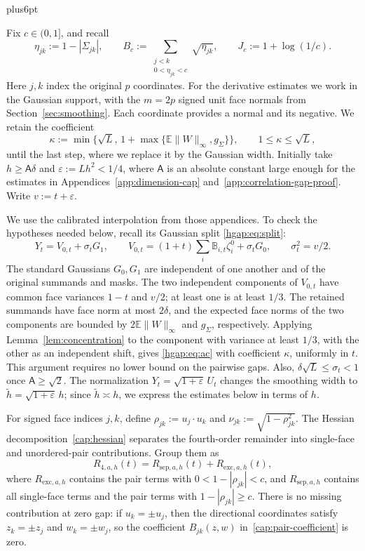 \documentclass[11pt,letterpaper,twoside,leqno]{article}
\makeatletter
\theoremstyle{bookplain}
\theoremstyle{bookremark}
\renewenvironment{proof}[1][\proofname]{\par
  \pushQED{\qed}\normalfont\topsep6pt plus6pt\relax
  \trivlist\item[\hskip\labelsep\bfseries #1\@addpunct{.}]\ignorespaces
}{\popQED\endtrivlist\@endpefalse}
\newcommand{\E}{\mathbb E}
\makeatother
\begin{document}
\begin{proof}[Proof of Corollary~\ref{cor:correlation-budget}]
Fix $c\in(0,1]$, and recall
\[
 \eta_{jk}:=1-|\Sigma_{jk}|,\qquad
 B_c:=\sum_{\substack{j<k\\0<\eta_{jk}<c}}\sqrt{\eta_{jk}},
 \qquad J_c:=1+\log(1/c).
\]
Here $j,k$ index the original $p$ coordinates. For the derivative
estimates we work in the Gaussian support, with the $m=2p$ signed
unit face normals from Section~\ref{sec:smoothing}. Each coordinate
provides a normal and its negative. We retain the coefficient
\[
 \kappa:=\min\{\sqrt L,\,1+\max\{\E\|W\|_\infty,g_\Sigma\}\},
 \qquad 1\le\kappa\le\sqrt L,
\]
until the last step, where we replace it by the Gaussian width.
Initially take $h\ge\mathsf A\delta$ and $\varepsilon:=Lh^2<1/4$,
where $\mathsf A$ is an absolute constant large enough for the
estimates in Appendices~\ref{app:dimension-cap}
and~\ref{app:correlation-gap-proof}. Write $v:=t+\varepsilon$.

We use the calibrated interpolation from those appendices. To check
the hypotheses needed below, recall its Gaussian split
\eqref{hgap:eq:split}:
\[
 Y_t=V_{0,t}+\sigma_tG_1,\qquad
 V_{0,t}=(1+t)\sum_i\mathbb B_{i,t}\zeta_i^0+\sigma_tG_0,
 \qquad \sigma_t^2=v/2.
\]
The standard Gaussians $G_0,G_1$ are independent of one another and
of the original summands and masks. The two independent components
of $V_{0,t}$ have common face variances $1-t$ and $v/2$; at least one
is at least $1/3$. The retained summands have face norm at most
$2\delta$, and the expected face norms of the two components are
bounded by $2\E\|W\|_\infty$ and $g_\Sigma$, respectively.
Applying Lemma~\ref{lem:concentration} to the component with variance
at least $1/3$, with the other as an independent shift, gives
\eqref{hgap:eq:ac} with coefficient $\kappa$, uniformly in $t$.
This argument requires no lower bound on the pairwise gaps.
Also, $\delta\sqrt L\le\sigma_t<1$ once $\mathsf A\ge\sqrt2$.
The normalization $Y_t=\sqrt{1+\varepsilon}\,U_t$ changes the
smoothing width to $\widetilde h=\sqrt{1+\varepsilon}\,h$;
since $\widetilde h\asymp h$, we express the estimates below in
terms of $h$.

For signed face indices $j,k$, define
$\rho_{jk}:=u_j\cdot u_k$ and
$\nu_{jk}:=\sqrt{1-\rho_{jk}^2}$.
The Hessian decomposition~\eqref{cap:hessian} separates the
fourth-order remainder into single-face and unordered-pair
contributions. Group them as
\[
 R_{4,a,h}(t)=R_{\mathrm{sep},a,h}(t)+R_{\mathrm{exc},a,h}(t),
\]
where $R_{\mathrm{exc},a,h}$ contains the pair terms with
$0<1-|\rho_{jk}|<c$, and $R_{\mathrm{sep},a,h}$ contains all
single-face terms and the pair terms with $1-|\rho_{jk}|\ge c$.
There is no missing contribution at zero gap: if $u_k=\pm u_j$,
then the directional coordinates satisfy $z_k=\pm z_j$ and
$w_k=\pm w_j$, so the coefficient
$B_{jk}(z,w)$ in~\eqref{cap:pair-coefficient} is zero.


\end{proof}
\end{document}

